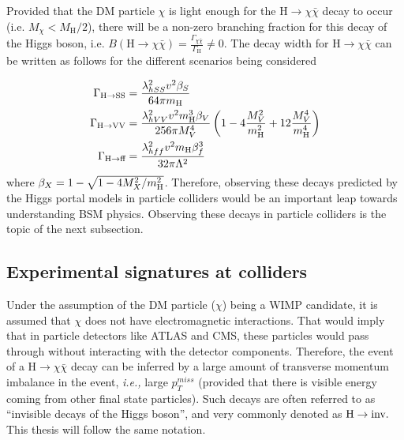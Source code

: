 Provided that the DM particle $\chi$ is light enough for the $\textrm{H} \rightarrow \chi \bar{\chi}$ decay to occur (i.e. $M_{\chi} < M_{\textrm{H}} / 2$), there will be a non-zero
branching fraction for this decay of the Higgs boson, i.e. $B(\textrm{H} \rightarrow \chi \bar{\chi}) = \frac{\Gamma_{\chi\bar{\chi}}}{\Gamma_{\textrm{H}}} \neq 0$. The decay width for
$\textrm{H} \rightarrow \chi \bar{\chi}$ can be written as follows for the different scenarios being considered~\cite{Djouadi:2011aa}

\begin{equation}
    \begin{split}
        \Gamma_{\textrm{H} \rightarrow \textrm{SS}} &= \frac{\lambda_{hSS}^{2} v^{2} \beta_{S}}{64 \pi m_{\textrm{H}}} \\
        \Gamma_{\textrm{H} \rightarrow \textrm{VV}} &= \frac{\lambda_{hVV}^{2} v^{2} m_{\textrm{H}}^{3} \beta_{V}}{256 \pi M_{V}^{4}} \left( 1 - 4 \frac{M_V^2}{m_{\textrm{H}}^2} + 12 \frac{M_V^4}{m_{\textrm{H}}^4} \right) \\
        \Gamma_{\textrm{H} \rightarrow \textrm{ff}} &= \frac{\lambda_{hff}^{2} v^{2} m_{\textrm{H}} \beta_{f}^{3}}{32 \pi \Lambda^{2}}
    \end{split}
\end{equation}
where $\beta_{X} = 1 - \sqrt{1 - 4 M_X^2 / m_{\textrm{H}}^2}$. 
Therefore, observing these decays predicted by the Higgs portal models in particle colliders would be an important
leap towards understanding BSM physics. Observing these decays in particle colliders is the topic of the next subsection.

\subsection{Experimental signatures at colliders}
\label{subsec:exp_signatures}

Under the assumption of the DM particle ($\chi$) being a WIMP candidate, it is assumed that $\chi$ does not have electromagnetic interactions. That would imply
that in particle detectors like ATLAS and CMS, these particles would pass through without interacting with the detector components. Therefore, the event of a
$\textrm{H} \rightarrow \chi \bar{\chi}$ decay can be inferred by a large amount of transverse momentum imbalance in the event, \textit{i.e.,} large $p_T^{miss}$ (provided that there
is visible energy coming from other final state particles). Such decays are often referred to as ``invisible decays of the Higgs boson'', and very
commonly denoted as $\textrm{H} \rightarrow \textrm{inv.}$ This thesis will follow the same notation.

